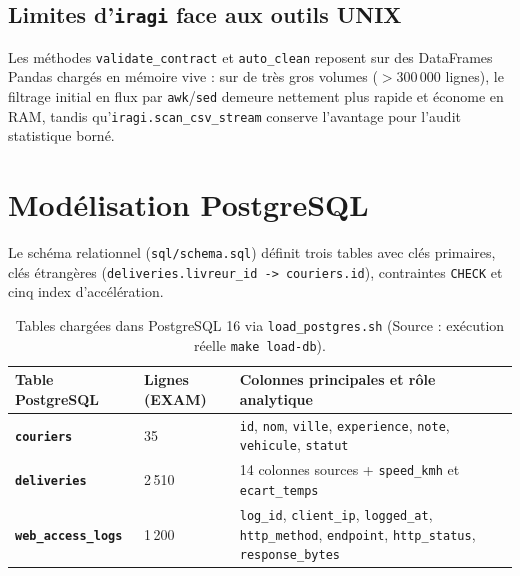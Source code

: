 \documentclass[11pt,a4paper]{article}
\begin{document}
\subsection{Limites d'\texttt{iragi} face aux outils UNIX}
Les m\'ethodes \texttt{validate\_contract} et \texttt{auto\_clean} reposent sur des DataFrames Pandas charg\'es en m\'emoire vive : sur de tr\`es gros volumes ($>300\,000$ lignes), le filtrage initial en flux par \texttt{awk}/\texttt{sed} demeure nettement plus rapide et \'econome en RAM, tandis qu'\texttt{iragi.scan\_csv\_stream} conserve l'avantage pour l'audit statistique born\'e.

\section{Mod\'elisation PostgreSQL}
Le sch\'ema relationnel (\texttt{sql/schema.sql}) d\'efinit trois tables avec cl\'es primaires, cl\'es \'etrang\`eres (\texttt{deliveries.livreur\_id -> couriers.id}), contraintes \texttt{CHECK} et cinq index d'acc\'el\'eration.

\begin{table}[H]
\centering
\small
\begin{tabularx}{\textwidth}{@{}>{\bfseries}p{3.2cm} p{2.8cm} X@{}}
\toprule
\rowcolor{slatebg} Table PostgreSQL & Lignes (EXAM) & Colonnes principales et r\^ole analytique \\
\midrule
\texttt{couriers} & 35 & \texttt{id}, \texttt{nom}, \texttt{ville}, \texttt{experience}, \texttt{note}, \texttt{vehicule}, \texttt{statut} \\
\rowcolor{rowalt} \texttt{deliveries} & 2\,510 & 14 colonnes sources + \texttt{speed\_kmh} et \texttt{ecart\_temps} \\
\texttt{web\_access\_logs} & 1\,200 & \texttt{log\_id}, \texttt{client\_ip}, \texttt{logged\_at}, \texttt{http\_method}, \texttt{endpoint}, \texttt{http\_status}, \texttt{response\_bytes} \\
\bottomrule
\end{tabularx}
\caption{Tables charg\'ees dans PostgreSQL 16 via \texttt{load\_postgres.sh} (Source : ex\'ecution r\'eelle \texttt{make load-db}).}
\end{table}

\end{document}
